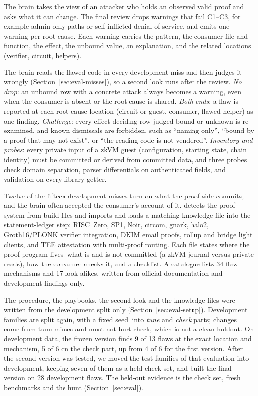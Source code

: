 The brain takes the view of an attacker who holds an observed valid proof and
asks what it can change. The final review drops warnings that fail C1--C3,
for example admin-only paths or self-inflicted denial of service, and emits
one warning per root cause. Each warning carries the pattern, the consumer
file and function, the effect, the unbound value, an explanation, and the
related locations (verifier, circuit, helpers).

The brain reads the flawed code in every development miss and then judges it
wrongly (Section~\ref{sec:eval-misses}), so a second look runs after the
review. \emph{No drop}: an unbound row with a concrete attack always becomes a
warning, even when the consumer is absent or the root cause is shared.
\emph{Both ends}: a flaw is reported at each root-cause location (circuit or
guest, consumer, flawed helper) as one finding. \emph{Challenge}: every
effect-deciding row judged bound or unknown is re-examined, and known
dismissals are forbidden, such as ``naming only'', ``bound by a proof that may
not exist'', or ``the reading code is not vendored''. \emph{Inventory and
probes}: every private input of a zkVM guest (configuration, starting state,
chain identity) must be committed or derived from committed data, and three
probes check domain separation, parser differentials on authenticated fields,
and validation on every library getter.

Twelve of the fifteen development misses turn on what the proof side commits,
and the brain often accepted the consumer's account of it. \tool{} detects the
proof system from build files and imports and loads a matching knowledge file
into the statement-ledger step: RISC~Zero, SP1, Noir, circom, gnark, halo2,
Groth16/PLONK verifier integration, DKIM email proofs, rollup and bridge light
clients, and TEE attestation with multi-proof routing. Each file states where
the proof program lives, what is and is not committed (a zkVM journal versus
private reads), how the consumer checks it, and a checklist. A catalogue lists
34 flaw mechanisms and 17 look-alikes, written from official documentation and
development findings only.

The procedure, the playbooks, the second look and the knowledge files were
written from the development split only (Section~\ref{sec:eval-setup}). Development families are split again, with a fixed seed, into \emph{tune}
and \emph{check} parts; changes come from tune misses and must not hurt check,
which is not a clean holdout. On development data, the frozen version finds 9 of 13 flaws at the
exact location and mechanism, 5 of 6 on the check part, up from 4 of 6 for
the first version. After the second version was tested, we moved the test
families of that evaluation into development, keeping seven of them as a held
check set, and built the final version on 28 development flaws. The held-out
evidence is the check set, fresh benchmarks and the hunt
(Section~\ref{sec:eval}).

